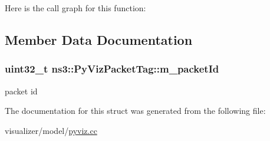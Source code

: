 Here is the call graph for this function\+:




\subsection{Member Data Documentation}
\subsubsection[{\texorpdfstring{m\+\_\+packet\+Id}{m_packetId}}]{\setlength{\rightskip}{0pt plus 5cm}uint32\+\_\+t ns3\+::\+Py\+Viz\+Packet\+Tag\+::m\+\_\+packet\+Id}\hypertarget{structns3_1_1PyVizPacketTag_a6b317f60903051c64318134fdf8aff59}{}\label{structns3_1_1PyVizPacketTag_a6b317f60903051c64318134fdf8aff59}


packet id 



The documentation for this struct was generated from the following file\+:\begin{DoxyCompactItemize}
\item 
visualizer/model/\hyperlink{pyviz_8cc}{pyviz.\+cc}\end{DoxyCompactItemize}
